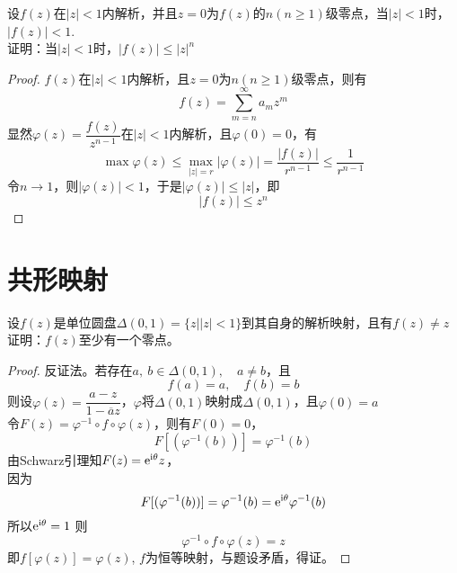 \begin{proposition}

    设$f(z)$在$|z| < 1 $内解析，并且$z = 0$为$f(z)$的$n(n \geq 1)$级零点，当$|z|<1$时，$|f(z)| < 1$.\\
    证明：当$|z|<1$时，$|f(z)| \leq |z|^n$

\end{proposition}

\begin{proof}
    
    $f(z)$在$|z|<1$内解析，且$z = 0$为$n(n \geq 1)$级零点，则有
    $$f(z) = \sum\limits_{m = n}^{\infty}{a_mz^m}$$
    显然$\varphi(z) = \dfrac{f(z)}{z^{n-1}}$在$|z|<1$内解析，且$\varphi(0) = 0$，有
    $$ \max\varphi(z) \leq \max_{|z| = r}|\varphi(z)| = \dfrac{|f(z)|}{r^{n-1}} \leq \dfrac{1}{r^{n-1}} $$
    令$n \to 1$，则$|\varphi(z)| < 1$，于是$|\varphi(z)| \leq |z|$，即
    $$|f(z)| \leq z^n$$

\end{proof}

\section{共形映射}

\begin{proposition}

    设$f(z)$是单位圆盘$\Delta(0,1) = \{z \big| |z| < 1 \}$到其自身的解析映射，且有$f(z) \neq z$\\
    证明：$f(z)$至少有一个零点。

\end{proposition}

\begin{proof}
    
    反证法。若存在$a,\ b\in \Delta(0,1), \quad a \neq b$，且
    $$f(a) = a, \quad  f(b) = b$$
    则设$\varphi(z) = \dfrac{a-z}{1-\overline{a}z}$，$\varphi$将$\Delta(0,1)$映射成$\Delta(0,1)$，且$\varphi(0) = a $\\
    令$F(z) = \varphi^{-1} \circ f \circ \varphi(z)$，则有$F(0) = 0$，
    $$F[(\varphi^{-1}(b))] = \varphi^{-1}(b)$$
    由\textup{Schwarz}引理知$F(z) = \mathrm{e}^{\mathrm{i \theta}}z$，\\
    因为
    $$F[(\varphi^{-1}(b))] = \varphi^{-1}(b) = \mathrm{e}^{\mathrm{i \theta}}\varphi^{-1}(b)$$
    所以$ \mathrm{e}^{\mathrm{i \theta}} = 1$
    则
    $$ \varphi^{-1} \circ f \circ \varphi(z) = z$$
    即$ f[\varphi(z)] = \varphi(z)$, $f$为恒等映射，与题设矛盾，得证。

\end{proof}

